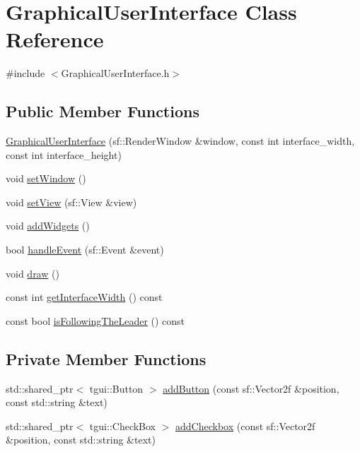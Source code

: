 \hypertarget{classGraphicalUserInterface}{}\section{Graphical\+User\+Interface Class Reference}
\label{classGraphicalUserInterface}


{\ttfamily \#include $<$Graphical\+User\+Interface.\+h$>$}

\subsection*{Public Member Functions}
\begin{DoxyCompactItemize}
\item 
\hyperlink{classGraphicalUserInterface_a53c95b6d9e7a7b1f04b60d925a8e2e7b}{Graphical\+User\+Interface} (sf\+::\+Render\+Window \&window, const int interface\+\_\+width, const int interface\+\_\+height)
\item 
void \hyperlink{classGraphicalUserInterface_a9dc5f335b77be5a4d871926155afb8dd}{set\+Window} ()
\item 
void \hyperlink{classGraphicalUserInterface_ab0c8cd6460442a3ad01c304ec1216631}{set\+View} (sf\+::\+View \&view)
\item 
void \hyperlink{classGraphicalUserInterface_a48e6dcc9acc179fdb74e67a51d66efb7}{add\+Widgets} ()
\item 
bool \hyperlink{classGraphicalUserInterface_a71964c3c49b23a05aa3fd4b4d36aa42d}{handle\+Event} (sf\+::\+Event \&event)
\item 
void \hyperlink{classGraphicalUserInterface_a268c54faf6a8ac32628c60495900ea1c}{draw} ()
\item 
const int \hyperlink{classGraphicalUserInterface_a6b168726ffb57ba7d06946d27435abad}{get\+Interface\+Width} () const
\item 
const bool \hyperlink{classGraphicalUserInterface_a9aa8920f70bf99225a7e8e4ff9cb5e3f}{is\+Following\+The\+Leader} () const
\end{DoxyCompactItemize}
\subsection*{Private Member Functions}
\begin{DoxyCompactItemize}
\item 
std\+::shared\+\_\+ptr$<$ tgui\+::\+Button $>$ \hyperlink{classGraphicalUserInterface_a91abd8446fe18cee7ff63a541a79da56}{add\+Button} (const sf\+::\+Vector2f \&position, const std\+::string \&text)
\item 
std\+::shared\+\_\+ptr$<$ tgui\+::\+Check\+Box $>$ \hyperlink{classGraphicalUserInterface_ac7094ec5d8ec8edd7325072f97f8de59}{add\+Checkbox} (const sf\+::\+Vector2f \&position, const std\+::string \&text)
\end{DoxyCompactItemize}
